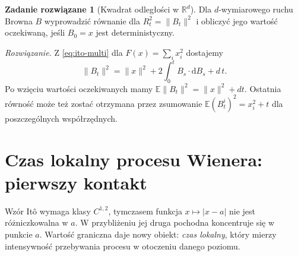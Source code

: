 \documentclass[11pt,a4paper,oneside]{report}
\numberwithin{equation}{chapter}
\theoremstyle{plain}
\theoremstyle{definition}
\newtheorem{zadanie}{Zadanie rozwiązane}[chapter]
\theoremstyle{remark}
\newcommand{\R}{\mathbb{R}}
\newcommand{\E}{\mathbb{E}}
\newcommand{\dd}{\mathrm{d}}
\newcommand{\norm}[1]{\lVert #1\rVert}
\begin{document}
\begin{zadanie}[Kwadrat odległości w $\R^d$]
Dla $d$-wymiarowego ruchu Browna $B$ wyprowadzić
równanie dla $R_t^2=\norm{B_t}^2$ i obliczyć jego
wartość oczekiwaną, jeśli $B_0=x$ jest deterministyczny.

\emph{Rozwiązanie.} Z \eqref{eq:ito-multi} dla
$F(x)=\sum_i x_i^2$ dostajemy
\[
\norm{B_t}^2=\norm{x}^2+2\int_0^t B_s\cdot\dd B_s+d\,t.
\]
Po wzięciu wartości oczekiwanych mamy
$\E\norm{B_t}^2=\norm{x}^2+dt$. Ostatnia równość
może też zostać otrzymana przez zsumowanie
$\E(B_t^i)^2=x_i^2+t$ dla poszczególnych współrzędnych.
\end{zadanie}

\section{Czas lokalny procesu Wienera: pierwszy kontakt}\label{sec:volIII:03:07}
Wzór Itô wymaga klasy $C^{1,2}$, tymczasem
funkcja $x\mapsto|x-a|$ nie jest różniczkowalna w $a$.
W przybliżeniu jej druga pochodna koncentruje się
w punkcie $a$. Wartość graniczna daje nowy obiekt:
\emph{czas lokalny}, który mierzy intensywność
przebywania procesu w otoczeniu danego poziomu.
\end{document}
